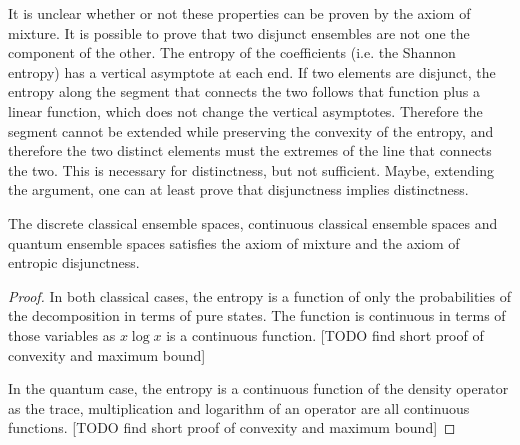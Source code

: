 \begin{remark}
	It is unclear whether or not these properties can be proven by the axiom of mixture. It is possible to prove that two disjunct ensembles are not one the component of the other. The entropy of the coefficients (i.e. the Shannon entropy) has a vertical asymptote at each end. If two elements are disjunct, the entropy along the segment that connects the two follows that function plus a linear function, which does not change the vertical asymptotes. Therefore the segment cannot be extended while preserving the convexity of the entropy, and therefore the two distinct elements must the extremes of the line that connects the two. This is necessary for distinctness, but not sufficient. Maybe, extending the argument, one can at least prove that disjunctness implies distinctness.
\end{remark}

\begin{prop}
	The discrete classical ensemble spaces, continuous classical ensemble spaces and quantum ensemble spaces satisfies the axiom of mixture and the axiom of entropic disjunctness.
\end{prop}

\begin{proof}
	In both classical cases, the entropy is a function of only the probabilities of the decomposition in terms of pure states. The function is continuous in terms of those variables as $x \log x$ is a continuous function. [TODO find short proof of convexity and maximum bound]
	
	In the quantum case, the entropy is a continuous function of the density operator as the trace, multiplication and logarithm of an operator are all continuous functions. [TODO find short proof of convexity and maximum bound]
\end{proof}

